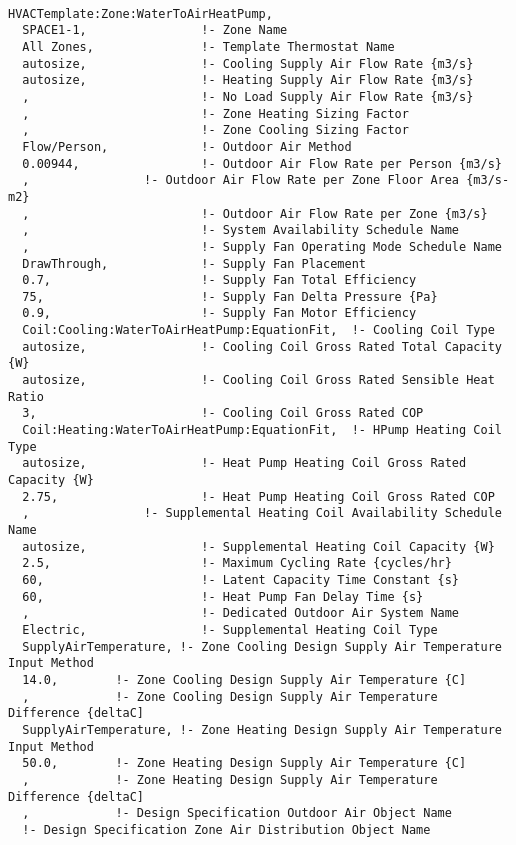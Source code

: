 \begin{lstlisting}

HVACTemplate:Zone:WaterToAirHeatPump,
  SPACE1-1,                !- Zone Name
  All Zones,               !- Template Thermostat Name
  autosize,                !- Cooling Supply Air Flow Rate {m3/s}
  autosize,                !- Heating Supply Air Flow Rate {m3/s}
  ,                        !- No Load Supply Air Flow Rate {m3/s}
  ,                        !- Zone Heating Sizing Factor
  ,                        !- Zone Cooling Sizing Factor
  Flow/Person,             !- Outdoor Air Method
  0.00944,                 !- Outdoor Air Flow Rate per Person {m3/s}
  ,                !- Outdoor Air Flow Rate per Zone Floor Area {m3/s-m2}
  ,                        !- Outdoor Air Flow Rate per Zone {m3/s}
  ,                        !- System Availability Schedule Name
  ,                        !- Supply Fan Operating Mode Schedule Name
  DrawThrough,             !- Supply Fan Placement
  0.7,                     !- Supply Fan Total Efficiency
  75,                      !- Supply Fan Delta Pressure {Pa}
  0.9,                     !- Supply Fan Motor Efficiency
  Coil:Cooling:WaterToAirHeatPump:EquationFit,  !- Cooling Coil Type
  autosize,                !- Cooling Coil Gross Rated Total Capacity {W}
  autosize,                !- Cooling Coil Gross Rated Sensible Heat Ratio
  3,                       !- Cooling Coil Gross Rated COP
  Coil:Heating:WaterToAirHeatPump:EquationFit,  !- HPump Heating Coil Type
  autosize,                !- Heat Pump Heating Coil Gross Rated Capacity {W}
  2.75,                    !- Heat Pump Heating Coil Gross Rated COP
  ,                !- Supplemental Heating Coil Availability Schedule Name
  autosize,                !- Supplemental Heating Coil Capacity {W}
  2.5,                     !- Maximum Cycling Rate {cycles/hr}
  60,                      !- Latent Capacity Time Constant {s}
  60,                      !- Heat Pump Fan Delay Time {s}
  ,                        !- Dedicated Outdoor Air System Name
  Electric,                !- Supplemental Heating Coil Type
  SupplyAirTemperature, !- Zone Cooling Design Supply Air Temperature Input Method
  14.0,        !- Zone Cooling Design Supply Air Temperature {C]
  ,            !- Zone Cooling Design Supply Air Temperature Difference {deltaC]
  SupplyAirTemperature, !- Zone Heating Design Supply Air Temperature Input Method
  50.0,        !- Zone Heating Design Supply Air Temperature {C]
  ,            !- Zone Heating Design Supply Air Temperature Difference {deltaC]
  ,            !- Design Specification Outdoor Air Object Name
  !- Design Specification Zone Air Distribution Object Name
\end{lstlisting}

